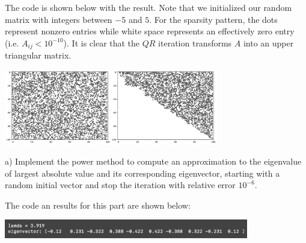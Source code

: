 
The code is shown below with the result.
Note that we initialized our random matrix with integers between $-5$ and $5$.
For the sparsity pattern, the dots represent nonzero entries while white space represents an effectively zero entry (i.e. $A_{ij} < 10^{-10}$).
It is clear that the $QR$ iteration transforms $A$ into an upper triangular matrix.


\begin{center}
    \includegraphics[width=0.7\textwidth]{prob4.pdf} 
\end{center}


a) Implement the power method to compute an approximation to the eigenvalue of largest absolute value and its corresponding eigenvector, starting with a random initial vector and stop the iteration with relative error $10^{-6}$.

The code an results for this part are shown below:

\begin{center}
    \includegraphics[width=0.8\textwidth]{prob5a.png}
\end{center}

